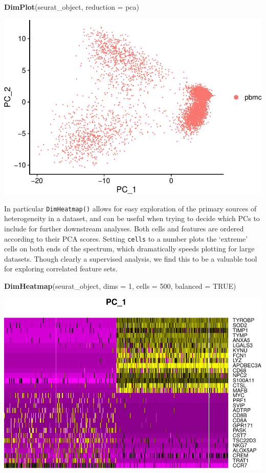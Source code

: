 \documentclass[
]{book}
\newenvironment{Shaded}{\begin{snugshade}}{\end{snugshade}}
\newcommand{\AttributeTok}[1]{\textcolor[rgb]{0.13,0.29,0.53}{#1}}
\newcommand{\ConstantTok}[1]{\textcolor[rgb]{0.56,0.35,0.01}{#1}}
\newcommand{\DecValTok}[1]{\textcolor[rgb]{0.00,0.00,0.81}{#1}}
\newcommand{\FunctionTok}[1]{\textcolor[rgb]{0.13,0.29,0.53}{\textbf{#1}}}
\newcommand{\NormalTok}[1]{#1}
\newcommand{\StringTok}[1]{\textcolor[rgb]{0.31,0.60,0.02}{#1}}
\begin{document}
\begin{Shaded}
\begin{Highlighting}[]
\FunctionTok{DimPlot}\NormalTok{(seurat\_object, }\AttributeTok{reduction =} \StringTok{\textquotesingle{}pca\textquotesingle{}}\NormalTok{)}
\end{Highlighting}
\end{Shaded}

\includegraphics{scRNAseqInR_ABACBS_2024_Doco_files/figure-latex/pca_viz-2.pdf}

In particular \texttt{DimHeatmap()} allows for easy exploration of the primary sources of heterogeneity in a dataset, and can be useful when trying to decide which PCs to include for further downstream analyses. Both cells and features are ordered according to their PCA scores. Setting \texttt{cells} to a number plots the `extreme' cells on both ends of the spectrum, which dramatically speeds plotting for large datasets. Though clearly a supervised analysis, we find this to be a valuable tool for exploring correlated feature sets.

\begin{Shaded}
\begin{Highlighting}[]
\FunctionTok{DimHeatmap}\NormalTok{(seurat\_object, }\AttributeTok{dims =} \DecValTok{1}\NormalTok{, }\AttributeTok{cells =} \DecValTok{500}\NormalTok{, }\AttributeTok{balanced =} \ConstantTok{TRUE}\NormalTok{)}
\end{Highlighting}
\end{Shaded}

\includegraphics{scRNAseqInR_ABACBS_2024_Doco_files/figure-latex/single-heatmap-1.pdf}
\end{document}
